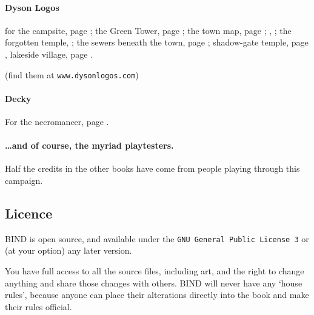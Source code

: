 \begin{multicols}{2}
\paragraph{Dyson Logos}

for the
campsite, page \pageref{Dyson_Logos/forgotten_city};
the Green Tower, page \pageref{Dyson_Logos/green_tower};
the town map, page \pageref{Dyson_Logos/town};
, \pageref{Dyson_Logos/mincing_pig};
the forgotten temple, \pageref{Dyson_Logos/qualme_temple};
the sewers beneath the town, page \pageref{Dyson_Logos/sewer};
shadow-gate temple, page \pageref{Dyson_Logos/shadow_gate},
lakeside village, page \pageref{Dyson_Logos/lakeside}.

(find them at {\tt www.dysonlogos.com})

\paragraph{Decky}

For the necromancer, page \pageref{Decky/necromancer}.

\paragraph{\ldots and of course, the myriad playtesters.}
Half the credits in the other books have come from people playing through this campaign.

\subsection*{Licence}

BIND is open source, and available under the {\tt GNU General Public License 3} or (at your option) any later version.

You have full access to all the source files, including art, and the right to change anything and share those changes with others.
BIND will never have any `house rules', because anyone can place their alterations directly into the book and make their rules official.

\end{multicols}

\pagebreak
